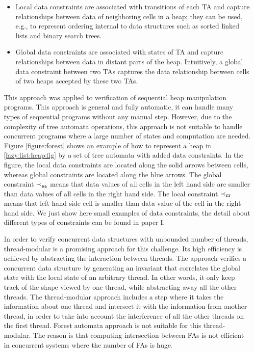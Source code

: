  \begin{itemize}
 	\item Local data constraints are associated with transitions of each TA and capture relationships between data of neighboring cells in a heap; they can be used, e.g., to represent ordering internal to data structures such as sorted linked lists and binary search trees.
 	\item Global data constraints are associated with states of TA and capture relationships between data in distant parts of the heap. Intuitively, a global data constraint between two TAs captures the data relationship between cells of two heaps accepted by these two TAs. 
 \end{itemize}
  This approach was applied to verification of sequential heap manipulation programs. This approach is general and fully automatic, it can handle many types of sequential programs without any manual step. However, due to the complexity of tree automata operations, this approach is not suitable to handle concurrent programs where a large number of states and computation are needed. Figure \ref{figure:forest} shows an example of how to represent a heap in \ref{lazy:list:heap:fig} by a set of tree automata with added data constraints. In the figure, the local data constraints are located along the solid arrows between cells, whereas global constraints are located along the blue arrows. The global constraint $\tt \prec_{aa}$ means that data values of all cells in the left hand side are smaller than data values of all cells in the right hand side. The local constraint $\tt \prec_{rr}$ means that left hand side cell is smaller than data value of the cell in the right hand side.  We just show here small examples of data constraints, the detail about different types of constraints can be found in paper I.    

In order to verify concurrent data structures with unbounded number of threads, thread-modular is a promising approach for this challenge. Its high efficiency is achieved by
abstracting the interaction between threads. The approach verifies a concurrent data structure by generating an invariant that correlates the global state with the local state of an
arbitrary thread. In other words, it only keep track of the shape viewed by one thread, while abstracting away all the other threads. The thread-modular
approach includes a step where it takes the information about one thread and
intersect it with the information from another thread, in order to take into account the interference of all the other threads on the first thread. Forest automata approach is not suitable for this thread-modular. The reason is that computing intersection between FAs is not efficient in concurrent systems where the number of FAs is huge. 


